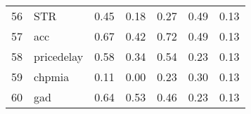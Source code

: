 \documentclass[12pt]{article}
\begin{document}
\begin{footnotesize}
\begin{longtable}{rl|c|c|c|c|c}
				56                   & STR                         & 0.45                             & 0.18                                                                                          & 0.27                                                                                          & 0.49                                                                                          & 0.13                                                                                                   \\
				57                   & acc                         & 0.67                             & 0.42                                                                                          & 0.72                                                                                          & 0.49                                                                                          & 0.13                                                                                                   \\
				58                   & pricedelay                  & 0.58                             & 0.34                                                                                          & 0.54                                                                                          & 0.23                                                                                          & 0.13                                                                                                   \\
				59                   & chpmia                      & 0.11                             & 0.00                                                                                          & 0.23                                                                                          & 0.30                                                                                          & 0.13                                                                                                   \\
				60                   & gad                         & 0.64                             & 0.53                                                                                          & 0.46                                                                                          & 0.23                                                                                          & 0.13                                                                                                   \\

\end{longtable}
\end{footnotesize}
\end{document}
